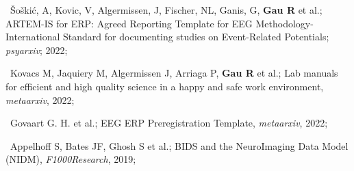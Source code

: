 
\textbullet~Šoškić, A, Kovic, V, Algermissen, J, Fischer, NL, Ganis, G, \textbf{Gau R} et al.;
{ARTEM-IS for ERP: Agreed Reporting Template for EEG Methodology-International Standard for documenting studies on Event-Related Potentials};
\textit{psyarxiv};
2022;
\newline
{}


\textbullet~Kovacs M, Jaquiery M, Algermissen J, Arriaga P, \textbf{Gau R} et al.;
Lab manuals for efficient and high quality science in a happy and safe work environment,
\textit{metaarxiv},
2022;
\newline
{}

\textbullet~Govaart G. H. et al.;
EEG ERP Preregistration Template,
\textit{metaarxiv},
2022;
\newline
{}

\textbullet~Appelhoff S, Bates JF, Ghosh S et al.;
BIDS and the NeuroImaging Data Model (NIDM),
\textit{F1000Research},
2019;
